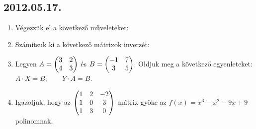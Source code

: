 \subsection*{2012.05.17.}
\begin{enumerate}
\item Végezzük el a következő műveleteket:

\item Számítsuk ki a következő mátrixok inverzét:
\item Legyen $A=\begin{pmatrix} 3 & 2 \\ 4 & 3\end{pmatrix}$ és $B=\begin{pmatrix} -1 & 7 \\ 3 & 5\end{pmatrix}$. Oldjuk meg a következő egyenleteket: $A\cdot X = B, \qquad Y\cdot A=B$.

\item Igazoljuk, hogy az $\begin{pmatrix} 1 & 2 & -2\\ 1 & 0 & 3\\ 1 & 3 & 0\end{pmatrix}$ mátrix gyöke az 
$f(x)=x^3-x^2-9x+9$ polinomnak.
\end{enumerate}


